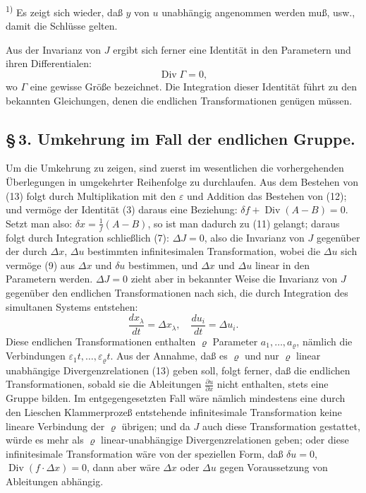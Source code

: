 \documentclass[12pt,a4paper]{article}
\begin{document}
\smallskip
\noindent\textsuperscript{1)} Es zeigt sich wieder, da\ss{} $y$ von $u$ unabh\"angig angenommen werden mu\ss{}, usw., damit die Schl\"usse gelten.

Aus der Invarianz von $J$ ergibt sich ferner eine Identit\"at in den Parametern und ihren Differentialen:
\begin{equation}\tag{12}
\operatorname{Div}\varGamma=0,
\end{equation}
wo $\varGamma$ eine gewisse Gr\"o\ss{}e bezeichnet. Die Integration dieser Identit\"at f\"uhrt zu den bekannten Gleichungen, denen die endlichen Transformationen gen\"ugen m\"ussen.

\subsection*{\S\,3. Umkehrung im Fall der endlichen Gruppe.}

Um die Umkehrung zu zeigen, sind zuerst im wesentlichen die vorhergehenden \"Uberlegungen in umgekehrter Reihenfolge zu durchlaufen. Aus dem Bestehen von (13) folgt durch Multiplikation mit den $\varepsilon$ und Addition das Bestehen von (12); und verm\"oge der Identit\"at (3) daraus eine Beziehung: $\delta f+\operatorname{Div}(A-B)=0$. Setzt man also: $\delta x=\tfrac{1}{f}(A-B)$, so ist man dadurch zu (11) gelangt; daraus folgt durch Integration schlie\ss{}lich (7): $\Delta J=0$, also die Invarianz von $J$ gegen\"uber der durch $\Delta x$, $\Delta u$ bestimmten infinitesimalen Transformation, wobei die $\Delta u$ sich verm\"oge (9) aus $\Delta x$ und $\delta u$ bestimmen, und $\Delta x$ und $\Delta u$ linear in den Parametern werden. $\Delta J=0$ zieht aber in bekannter Weise die Invarianz von $J$ gegen\"uber den endlichen Transformationen nach sich, die durch Integration des simultanen Systems entstehen:
\begin{equation}\tag{17}
\frac{dx_{\lambda}}{dt}=\Delta x_{\lambda},\quad\frac{du_{i}}{dt}=\Delta u_{i}.
\end{equation}
Diese endlichen Transformationen enthalten $\varrho$ Parameter $a_{1},\ldots,a_{\varrho}$, n\"amlich die Verbindungen $\varepsilon_{1}t,\ldots,\varepsilon_{\varrho}t$. Aus der Annahme, da\ss{} es $\varrho$ und nur $\varrho$ linear unabh\"angige Divergenzrelationen (13) geben soll, folgt ferner, da\ss{} die endlichen Transformationen, sobald sie die Ableitungen $\tfrac{\partial u}{\partial x}$ nicht enthalten, stets eine Gruppe bilden. Im entgegengesetzten Fall w\"are n\"amlich mindestens eine durch den Lieschen Klammerproze\ss{} entstehende infinitesimale Transformation keine lineare Verbindung der $\varrho$ \"ubrigen; und da $J$ auch diese Transformation gestattet, w\"urde es mehr als $\varrho$ linear-unabh\"angige Divergenzrelationen geben; oder diese infinitesimale Transformation w\"are von der speziellen Form, da\ss{} $\delta u=0$, $\operatorname{Div}(f\cdot\Delta x)=0$, dann aber w\"are $\Delta x$ oder $\Delta u$ gegen Voraussetzung von Ableitungen abh\"angig.
\end{document}
